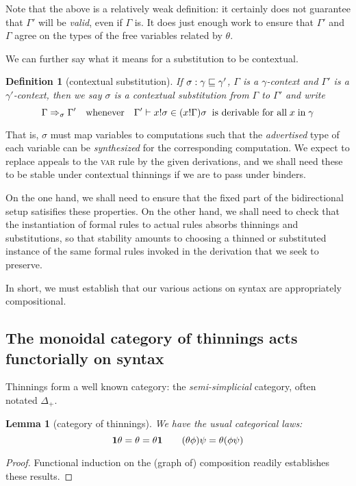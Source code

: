 \documentclass{jfp1}
\newtheorem{lemma}[theorem]{Lemma}
\newtheorem{definition}[theorem]{Definition}
\begin{document}
Note that the above is a relatively weak definition: it certainly does
not guarantee that $\Gamma'$ will be \emph{valid}, even if $\Gamma$
is. It does just enough work to ensure that $\Gamma'$ and $\Gamma$
agree on the types of the free variables related by $\theta$.

We can further say what it means for a substitution to be contextual.

\begin{definition}[contextual substitution]
  If $\sigma:\gamma\sqsubseteq\gamma'$, $\Gamma$ is a $\gamma$-context and
  $\Gamma'$ is a $\gamma'$-context, then we say $\sigma$ is a
  \emph{contextual} substitution from $\Gamma$ to $\Gamma'$ and write
  \[
    \Gamma\Rightarrow_\sigma\Gamma'\quad \mbox{whenever}\quad
    \Gamma'\vdash x!\sigma \in (x!\Gamma)\sigma\;\;\mbox{is
      derivable for all}\;x\;\mbox{in}\;\gamma
    \]
\end{definition}

That is, $\sigma$ must map variables to computations such that the
\emph{advertised} type of each variable can be \emph{synthesized}
for the corresponding computation. We expect to replace appeals
to the \textsc{var} rule by the given derivations, and we shall need
these to be stable under contextual thinnings if we are to pass under binders.

On the one hand, we shall need to ensure that the fixed part of the
bidirectional setup satisifies these properties. On the other hand,
we shall need to check that the instantiation of formal rules to
actual rules absorbs thinnings and substitutions, so that stability
amounts to choosing a thinned or substituted instance of the same
formal rules invoked in the derivation that we seek to preserve.

In short, we must establish that our various actions on syntax are
appropriately compositional.


\subsection{The monoidal category of thinnings acts functorially on syntax\label{sec:thincat}}

Thinnings form a well known category: the \emph{semi-simplicial} category, often notated $\Delta_+$.


\begin{lemma}[category of thinnings]
  We have the usual categorical laws:
  \[
    \mathbf{1}\theta = \theta = \theta\mathbf{1} \qquad
    (\theta\phi)\psi = \theta(\phi\psi)
    \]
\end{lemma}
\begin{proof}
  Functional induction on the (graph of) composition readily establishes these results.
\end{proof}
\end{document}

